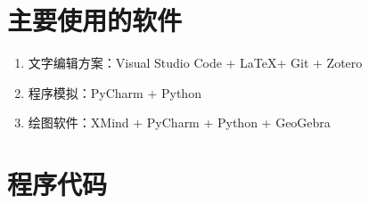 %
%



\nocite{*}      %


%
%

\appendix

\section{主要使用的软件}

\begin{enumerate}
    \item 文字编辑方案：Visual Studio Code + \LaTeX + Git + Zotero
    \item 程序模拟：PyCharm + Python
    \item 绘图软件：XMind + PyCharm + Python + GeoGebra
\end{enumerate}

\section{程序代码}

\begin{mgCodeBlock}
\end{mgCodeBlock}